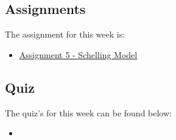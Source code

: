 \subsection{Assignments}

The assignment for this week is:

\begin{itemize}
    \item \href{https://github.com/QuantumCompiler/CU/tree/main/CSPB%203702%20-%20Cognitive%20Science/Assignments/Assignment%205%20-%20Schelling%20Model}{Assignment 5 - Schelling Model}
\end{itemize}

\subsection{Quiz}

The quiz's for this week can be found below:

\begin{itemize}
    \item {}
\end{itemize}